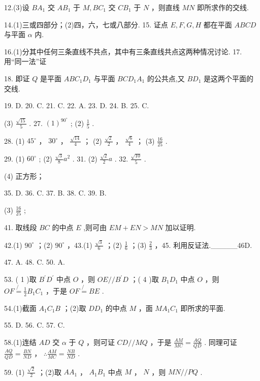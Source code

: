 \documentclass[10pt]{article}
\begin{document}
12.(3)设 \(B{A}_{1}\) 交 \(A{B}_{1}\) 于 \(M,B{C}_{1}\) 交 \(C{B}_{1}\) 于 \(N\) ，则直线 \({MN}\) 即所求作的交线.

14.(1)三或四部分；(2)四，六，七或八部分. 15. 证点 \(E,F,G,H\) 都在平面 \({ABCD}\) 与平面 \(\alpha\) 内.

16.(1)分其中任何三条直线不共点，其中有三条直线共点这两种情况讨论. 17. 用“同一法”证

18. 即证 \(Q\) 是平面 \({AB}{C}_{1}{D}_{1}\) 与平面 \({BC}{D}_{1}{A}_{1}\) 的公共点,又 \(B{D}_{1}\) 是这两个平面的交线.

19. D. 20. C. 21. C. 22. A. 23. D. 24. B. 25. C.

(3) \(\frac{\sqrt{15}}{5}\) . 27. \({\left( 1\right) }^{{90}^{ \circ  }}\) ; (2) \(\frac{1}{5}\) .

28. (1) \({45}^{ \circ  }\) ， \({30}^{ \circ  }\) ， \(\frac{\sqrt{14}}{4}\) ； (2) \(\frac{\sqrt{2}}{2}\) ， \(\frac{\sqrt{6}}{4}\) ； (3) \(\frac{16}{25}\) .

29. (1) \({60}^{ \circ  }\) ; (2) \(\frac{\sqrt{3}}{8}{a}^{2}\) . 31. (2) \(\frac{\sqrt{2}}{2}a\) . 32. \(\frac{\sqrt{10}}{5}\) .

(4) 正方形；

35. D. 36. C. 37. B. 38. C. 39. B.

(3) \(\frac{16}{25}\) ;

41. 取线段 \({BC}\) 的中点 \(E\) ,则可由 \({EM} + {EN} > {MN}\) 加以证明.

42.(1) \({90}^{ \circ  }\) ；(2) \({90}^{ \circ  }\) ，43.(1) \(\frac{\sqrt{3}}{6}\) ；(2) \(\frac{1}{6}\) ；(3) \(\frac{2}{3}\) ，45. 利用反证法.\_\_\_\_\_46D.

47. A. 48. C. 50. A.

53. ( 1 )取 \({B}^{\prime }{D}^{\prime }\) 中点 \(O\) ，则 \({OE}//{B}^{\prime }D\) ；( 4 )取 \({B}_{1}{D}_{1}\) 中点 \(O\) ，则 \({OF}\not{= }{\frac{1}{2}{B}_{1}{C}_{1}}\) ，于是 \({OF}\not{= }{BE}\) .

54.(1)截面 \({A}_{1}{C}_{1}B\) ；(2)取 \(D{D}_{1}\) 的中点 \(M\) ，面 \(M{A}_{1}{C}_{1}\) 即所求的平面.

55. D. 56. C. 57. C.

58.(1)连结 \({AD}\) 交 \(\alpha\) 于 \(Q\) ，则可证 \({CD}//{MQ}\) ，于是 \(\frac{AM}{MC} = \frac{AQ}{QD}\) . 同理可证 \(\frac{AQ}{QD} = \frac{BN}{ND}\) ， \(\therefore \frac{AM}{MC} = \frac{NB}{ND}\) .

59. (1) \(\frac{\sqrt{2}}{2}\) ；(2)取 \(A{A}_{1}\) ， \({A}_{1}{B}_{1}\) 中点 \(M\) ， \(N\) ，则 \({MN}//{PQ}\) .
\end{document}

